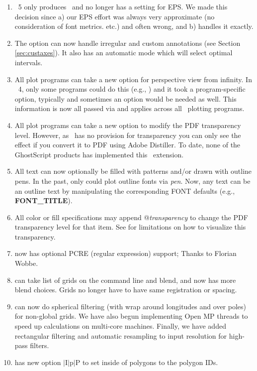 \begin{enumerate}
	\item \GMT\ 5 only produces \PS\ and no longer has a setting for EPS.  We made this decision since a) our EPS effort was always
		very approximate (no consideration of font metrics. etc.) and often wrong, and b)  handles it exactly.
	\item The  option can now handle irregular and custom annotations (see Section \ref{sec:custaxes}).
		It also has an automatic mode which will select optimal intervals.
	\item All plot programs can take a new  option for perspective view from infinity.  In \GMT\ 4, only some
		programs could do this (e.g., ) and it took a program-specific option, typically  and
		sometimes an option  would be needed as well.  This information is now all passed via  and
		applies across all \GMT\ plotting programs.
	\item All plot programs can take a new  option to modify the PDF transparency level.  However, as \PS\ has
		no provision for transparency you can only see the effect if you convert it to PDF using Adobe Distiller.
		To date, none of the GhostScript products has implemented this \PS\ extension.
	\item All text can now optionally be filled with patterns and/or drawn with outline pens.  In the past, only
		 could plot outline fonts via \emph{pen}.  Now, any text can be an outline text
		by manipulating the corresponding FONT defaults (e.g., \textbf{FONT\_TITLE}).
	\item All color or fill specifications may append @\emph{transparency} to change the PDF transparency level for that item.
		See  for limitations on how to visualize this transparency.
	\item {} now has optional PCRE (regular expression) support; Thanks to Florian Wobbe.
	\item {} can take list of grids on the command line and blend, and now has more blend choices.  Grids no
		longer have to have same registration or spacing.
	\item {} can now do spherical filtering (with wrap around longitudes and over poles) for non-global grids.
		We have also begun implementing Open MP threads to speed up calculations on multi-core machines.  Finally, we have
		added rectangular filtering and automatic resampling to input resolution for high-pass filters.
	\item {} has new option $|$I$|$p$|$P to set inside of polygons to the polygon IDs.

\end{enumerate}
